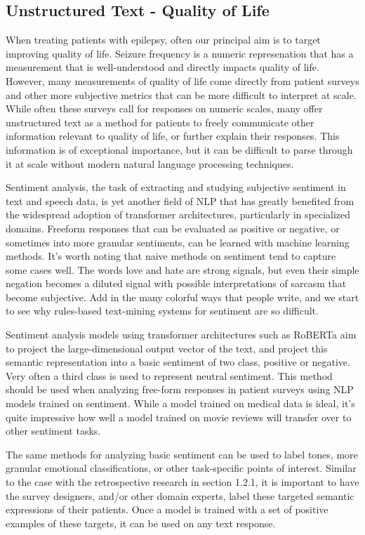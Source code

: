 \subsection{Unstructured Text - Quality of Life}
When treating patients with epilepsy, often our principal aim is to target improving quality of life. Seizure frequency is a numeric represenation that has a measurement
that is well-understood and directly impacts quality of life. However, many measurements of quality of life come directly from patient surveys and other more subjective
metrics that can be more difficult to interpret at scale. While often these surveys call for responses on numeric scales, many offer unstructured text as a method for
patients to freely communicate other information relevant to quality of life, or further explain their responses. This information is of exceptional importance, but it
can be difficult to parse through it at scale without modern natural language processing techniques.

Sentiment analysis, the task of extracting and studying subjective sentiment in text and speech data, is yet another field of NLP that has greatly benefited from the
widespread adoption of transformer architectures, particularly in specialized domains. Freeform responses that can be evaluated as positive or negative, or sometimes into more
granular sentiments, can be learned with machine learning methods. It's worth noting that naive methods on sentiment tend to capture some cases well. The words love and hate are
strong signals, but even their simple negation becomes a diluted signal with possible interpretations of sarcasm that become subjective. Add in the many colorful ways that people
write, and we start to see why rules-based text-mining systems for sentiment are so difficult.

Sentiment analysis models using transformer architectures such as RoBERTa aim to project the large-dimensional output vector of the text, and project this semantic representation
into a basic sentiment of two class, positive or negative. Very often a third class is used to represent neutral sentiment. This method should be used when analyzing free-form responses
in patient surveys using NLP models trained on sentiment. While a model trained on medical data is ideal, it's quite impressive how well a model trained on movie reviews will transfer
over to other sentiment tasks.

The same methods for analyzing basic sentiment can be used to label tones, more granular emotional classifications, or other task-specific points of interest. Similar to
the case with the retrospective research in section 1.2.1, it is important to have the survey designers, and/or other domain experts, label these targeted semantic
expressions of their patients. Once a model is trained with a set of positive examples of these targets, it can be used on any text response.

